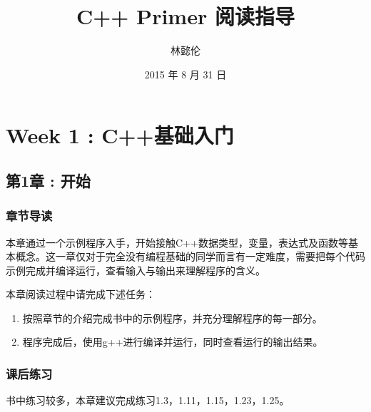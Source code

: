 \documentclass[11pt]{article}
\author{林懿伦}
\date{2015 年 8 月 31 日}
\title{C++ Primer 阅读指导}
\begin{document}
\maketitle
\tableofcontents


\section{Week 1 : C++基础入门}
\label{sec:orgheadline16}

\subsection{第1章 : 开始}
\label{sec:orgheadline9}

\subsubsection{章节导读}
\label{sec:orgheadline1}
本章通过一个示例程序入手，开始接触C++数据类型，变量，表达式及函数等基本概念。这一章仅对于完全没有编程基础的同学而言有一定难度，需要把每个代码示例完成并编译运行，查看输入与输出来理解程序的含义。

本章阅读过程中请完成下述任务：
\begin{enumerate}
\item 按照章节的介绍完成书中的示例程序，并充分理解程序的每一部分。
\item 程序完成后，使用g++进行编译并运行，同时查看运行的输出结果。
\end{enumerate}

\subsubsection{课后练习}
\label{sec:orgheadline7}
书中练习较多，本章建议完成练习1.3，1.11，1.15，1.23，1.25。
\end{document}
